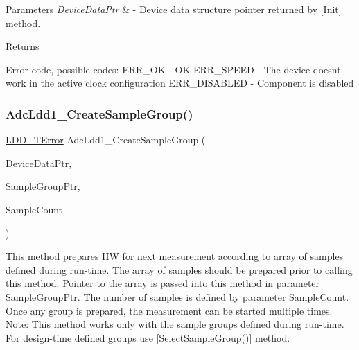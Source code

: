 \begin{DoxyParams}{Parameters}
{\em Device\+Data\+Ptr} & -\/ Device data structure pointer returned by \mbox{[}Init\mbox{]} method. \\
\hline
\end{DoxyParams}
\begin{DoxyReturn}{Returns}

\begin{DoxyItemize}
\item Error code, possible codes\+: E\+R\+R\+\_\+\+OK -\/ OK E\+R\+R\+\_\+\+S\+P\+E\+ED -\/ The device doesn\textquotesingle{}t work in the active clock configuration E\+R\+R\+\_\+\+D\+I\+S\+A\+B\+L\+ED -\/ Component is disabled 
\end{DoxyItemize}
\end{DoxyReturn}
\mbox{\label{group___adc_ldd1__module_ga86203c058acad0397b653ce3a4a625a4}} 
\subsubsection{\texorpdfstring{Adc\+Ldd1\+\_\+\+Create\+Sample\+Group()}{AdcLdd1\_CreateSampleGroup()}}
{\footnotesize\ttfamily \hyperlink{group___p_e___types__module_ga24c2b045fd04e79e85f261ce4df35588}{L\+D\+D\+\_\+\+T\+Error} Adc\+Ldd1\+\_\+\+Create\+Sample\+Group (\begin{DoxyParamCaption}\item[{\hyperlink{group___p_e___types__module_gac5cf1362f1f0e3a2ce71b1bf2276d091}{L\+D\+D\+\_\+\+T\+Device\+Data} $\ast$}]{Device\+Data\+Ptr,  }\item[{\hyperlink{struct_l_d_d___a_d_c___t_sample}{L\+D\+D\+\_\+\+A\+D\+C\+\_\+\+T\+Sample} $\ast$}]{Sample\+Group\+Ptr,  }\item[{uint8\+\_\+t}]{Sample\+Count }\end{DoxyParamCaption})}



This method prepares HW for next measurement according to array of samples defined during run-\/time. The array of samples should be prepared prior to calling this method. Pointer to the array is passed into this method in parameter Sample\+Group\+Ptr. The number of samples is defined by parameter Sample\+Count. Once any group is prepared, the measurement can be started multiple times. Note\+: This method works only with the sample groups defined during run-\/time. For design-\/time defined groups use \mbox{[}Select\+Sample\+Group()\mbox{]} method. 


